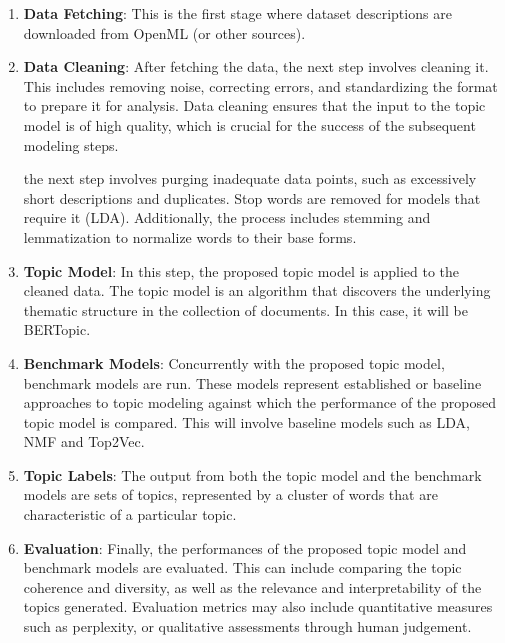 \documentclass{article}
\begin{document}
\begin{enumerate}

    \item \textbf{Data Fetching}: This is the first stage where dataset descriptions are downloaded from OpenML (or other sources).

    \item \textbf{Data Cleaning}: After fetching the data, the next step involves cleaning it. This includes removing noise, correcting errors, and standardizing the format to prepare it for analysis. Data cleaning ensures that the input to the topic model is of high quality, which is crucial for the success of the subsequent modeling steps.

          the next step involves purging inadequate data points, such as excessively short descriptions and duplicates. Stop words are removed for models that require it (LDA). Additionally, the process includes stemming and lemmatization to normalize words to their base forms.

    \item \textbf{Topic Model}: In this step, the proposed topic model is applied to the cleaned data. The topic model is an algorithm that discovers the underlying thematic structure in the collection of documents. In this case, it will be BERTopic.

    \item \textbf{Benchmark Models}: Concurrently with the proposed topic model, benchmark models are run. These models represent established or baseline approaches to topic modeling against which the performance of the proposed topic model is compared. This will involve baseline models such as LDA, NMF and Top2Vec.

    \item \textbf{Topic Labels}: The output from both the topic model and the benchmark models are sets of topics, represented by a cluster of words that are characteristic of a particular topic.

    \item \textbf{Evaluation}: Finally, the performances of the proposed topic model and benchmark models are evaluated. This can include comparing the topic coherence and diversity, as well as the relevance and interpretability of the topics generated. Evaluation metrics may also include quantitative measures such as perplexity, or qualitative assessments through human judgement.

\end{enumerate}
\end{document}
